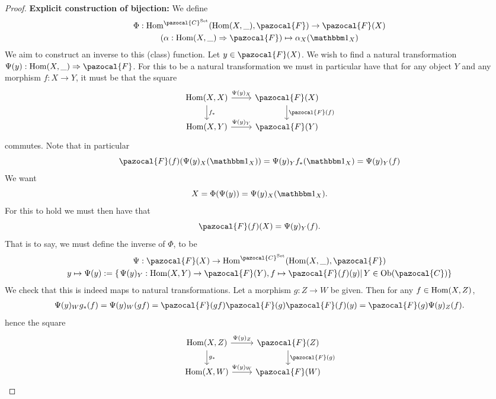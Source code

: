 \begin{proof}
    \textbf{Explicit construction of bijection:}
    We define
    \begin{gather*}
        \Phi : \Hom^{\pazocal{C}^\mathrm{Set}}(\Hom(X,\_),\pazocal{F}) \rightarrow \pazocal{F}(X)\\
        (\alpha : \Hom(X,\_) \Rightarrow \pazocal{F})  \mapsto \alpha_X(\fone_X)
    \end{gather*}
    We aim to construct an inverse to this (class) function. Let $y\in \pazocal{F}(X)$. We wish to find a natural transformation $\Psi(y) : \Hom(X,\_)\Rightarrow \pazocal{F}$. For this to be a natural transformation we must in particular have that for any object $Y$ and any morphism $f: X\rightarrow Y$, it must be that the square 
    $$
        \begin{tikzcd}
            \Hom(X,X) \arrow[r, "\Psi(y)_X"] \arrow[d,"f_\ast"] & \pazocal{F}(X) \arrow[d,"\pazocal{F}(f)"]\\
            \Hom(X,Y) \arrow[r,"\Psi(y)_Y"] & \pazocal{F}(Y)
        \end{tikzcd}    
    $$
    commutes. Note that in particular
    $$
        \pazocal{F}(f)(\Psi(y)_X(\fone_X))= \Psi(y)_Yf_\ast(\fone_X)= \Psi(y)_Y(f)
    $$
    We want 
    $$X= \Phi(\Psi(y)) = \Psi(y)_X(\fone_X).$$
    For this to hold we must then have that 
    $$\pazocal{F}(f)(X) = \Psi(y)_Y(f).$$
    That is to say, we must define the inverse of $\Phi$, to be 
    \begin{gather*}
        \Psi:\pazocal{F}(X)\rightarrow \Hom^{\pazocal{C}^\mathrm{Set}}(\Hom(X,\_),\pazocal{F})\\
        y \mapsto \Psi(y):= \{\left.\Psi(y)_Y : \Hom(X,Y)\rightarrow \pazocal{F}(Y), f\mapsto \pazocal{F}(f)(y)\right| Y\in \Ob(\pazocal{C}) \}
    \end{gather*}
    We check that this is indeed maps to natural transformations. Let a morphism $g: Z\rightarrow W$ be given. Then for any $f\in \mathrm{Hom}(X,Z)$,
    \begin{align*}
        \Psi(y)_Wg_\ast(f) = \Psi(y)_W(gf) =\pazocal{F}(gf) \pazocal{F}(g)\pazocal{F}(f)(y) = \pazocal{F}(g)\Psi(y)_Z(f).
    \end{align*}
    hence the square
    $$
        \begin{tikzcd}
            \Hom(X,Z) \arrow[r,"\Psi(y)_Z"]\arrow[d,"g_\ast"] & \pazocal{F}(Z)\arrow[d,"\pazocal{F}(g)"] \\
            \Hom(X,W) \arrow[r,"\Psi(y)_W"] & \pazocal{F}(W)
        \end{tikzcd}
$$
\end{proof}
